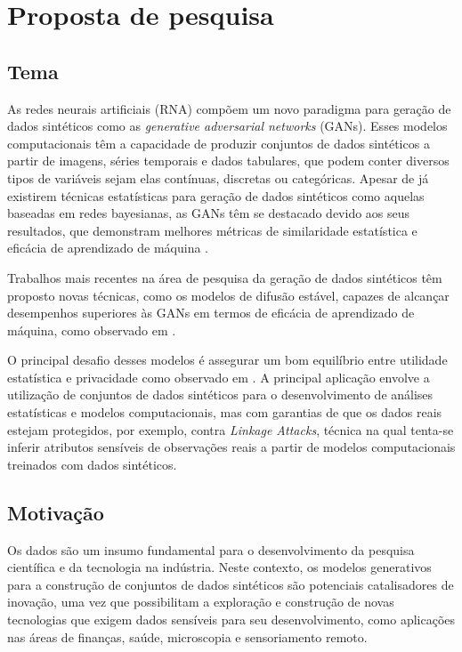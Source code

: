 \chapter{Proposta de pesquisa}

\section{Tema}

As redes neurais artificiais (RNA) compõem um novo paradigma para geração de dados sintéticos como as \textit{generative adversarial networks} (GANs). Esses modelos computacionais têm a capacidade de produzir conjuntos de dados sintéticos a partir de imagens, séries temporais e dados tabulares, que podem conter diversos tipos de variáveis sejam elas contínuas, discretas ou categóricas. Apesar de já existirem técnicas estatísticas para geração de dados sintéticos como aquelas baseadas em redes bayesianas, as GANs têm se destacado devido aos seus resultados, que demonstram melhores métricas de similaridade estatística e eficácia de aprendizado de máquina \cite{xu2019}.

Trabalhos mais recentes na área de pesquisa da geração de dados sintéticos têm proposto novas técnicas, como os modelos de difusão estável, capazes de alcançar desempenhos superiores às GANs em termos de eficácia de aprendizado de máquina, como observado em .

O principal desafio desses modelos é assegurar um bom equilíbrio entre utilidade estatística e privacidade como observado em . A principal aplicação envolve a utilização de conjuntos de dados sintéticos para o desenvolvimento de análises estatísticas e modelos computacionais, mas com garantias de que os dados reais estejam protegidos, por exemplo, contra \textit{Linkage Attacks}, técnica na qual tenta-se inferir atributos sensíveis de observações reais a partir de modelos computacionais treinados com dados sintéticos.

\section{Motivação}

Os dados são um insumo fundamental para o desenvolvimento da pesquisa científica e da tecnologia na indústria. Neste contexto, os modelos generativos para a construção de conjuntos de dados sintéticos são potenciais catalisadores de inovação, uma vez que possibilitam a exploração e construção de novas tecnologias que exigem dados sensíveis para seu desenvolvimento, como aplicações nas áreas de finanças, saúde, microscopia e sensoriamento remoto\cite{review2022}.

